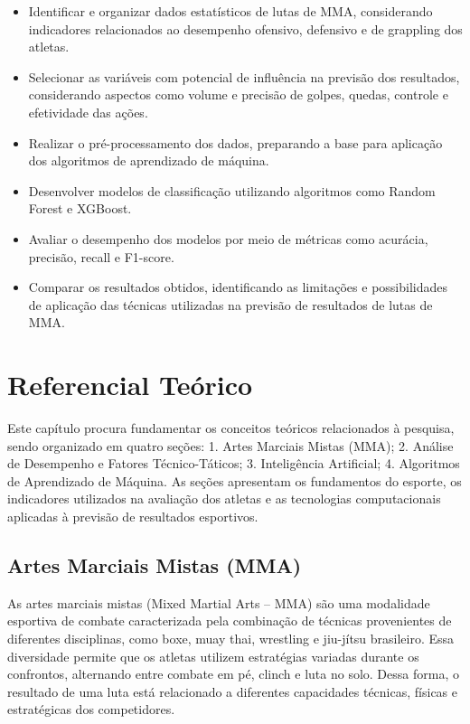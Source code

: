 \documentclass[12pt,a4paper]{report}
\begin{document}
\begin{itemize}[leftmargin=2em]
    \item Identificar e organizar dados estatísticos de lutas de MMA, considerando indicadores relacionados ao desempenho ofensivo, defensivo e de grappling dos atletas.
    \item Selecionar as variáveis com potencial de influência na previsão dos resultados, considerando aspectos como volume e precisão de golpes, quedas, controle e efetividade das ações.
    \item Realizar o pré-processamento dos dados, preparando a base para aplicação dos algoritmos de aprendizado de máquina.
    \item Desenvolver modelos de classificação utilizando algoritmos como Random Forest e XGBoost.
    \item Avaliar o desempenho dos modelos por meio de métricas como acurácia, precisão, recall e F1-score.
    \item Comparar os resultados obtidos, identificando as limitações e possibilidades de aplicação das técnicas utilizadas na previsão de resultados de lutas de MMA.
\end{itemize}

\chapter{Referencial Teórico}

Este capítulo procura fundamentar os conceitos teóricos relacionados à pesquisa, sendo organizado em quatro seções: 1. Artes Marciais Mistas (MMA); 2. Análise de Desempenho e Fatores Técnico-Táticos; 3. Inteligência Artificial; 4. Algoritmos de Aprendizado de Máquina. As seções apresentam os fundamentos do esporte, os indicadores utilizados na avaliação dos atletas e as tecnologias computacionais aplicadas à previsão de resultados esportivos.

\section{Artes Marciais Mistas (MMA)}

As artes marciais mistas (Mixed Martial Arts -- MMA) são uma modalidade esportiva de combate caracterizada pela combinação de técnicas provenientes de diferentes disciplinas, como boxe, muay thai, wrestling e jiu-jítsu brasileiro. Essa diversidade permite que os atletas utilizem estratégias variadas durante os confrontos, alternando entre combate em pé, clinch e luta no solo. Dessa forma, o resultado de uma luta está relacionado a diferentes capacidades técnicas, físicas e estratégicas dos competidores.
\end{document}
